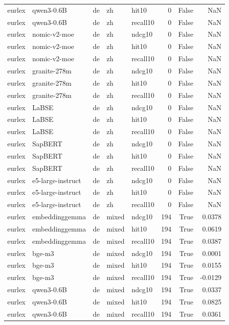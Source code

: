 \begin{tabular}{lllllrrr}
eurlex & qwen3-0.6B & de & zh & hit10 & 0 & False & NaN \\
eurlex & qwen3-0.6B & de & zh & recall10 & 0 & False & NaN \\
eurlex & nomic-v2-moe & de & zh & ndcg10 & 0 & False & NaN \\
eurlex & nomic-v2-moe & de & zh & hit10 & 0 & False & NaN \\
eurlex & nomic-v2-moe & de & zh & recall10 & 0 & False & NaN \\
eurlex & granite-278m & de & zh & ndcg10 & 0 & False & NaN \\
eurlex & granite-278m & de & zh & hit10 & 0 & False & NaN \\
eurlex & granite-278m & de & zh & recall10 & 0 & False & NaN \\
eurlex & LaBSE & de & zh & ndcg10 & 0 & False & NaN \\
eurlex & LaBSE & de & zh & hit10 & 0 & False & NaN \\
eurlex & LaBSE & de & zh & recall10 & 0 & False & NaN \\
eurlex & SapBERT & de & zh & ndcg10 & 0 & False & NaN \\
eurlex & SapBERT & de & zh & hit10 & 0 & False & NaN \\
eurlex & SapBERT & de & zh & recall10 & 0 & False & NaN \\
eurlex & e5-large-instruct & de & zh & ndcg10 & 0 & False & NaN \\
eurlex & e5-large-instruct & de & zh & hit10 & 0 & False & NaN \\
eurlex & e5-large-instruct & de & zh & recall10 & 0 & False & NaN \\
eurlex & embeddinggemma & de & mixed & ndcg10 & 194 & True & 0.0378 \\
eurlex & embeddinggemma & de & mixed & hit10 & 194 & True & 0.0619 \\
eurlex & embeddinggemma & de & mixed & recall10 & 194 & True & 0.0387 \\
eurlex & bge-m3 & de & mixed & ndcg10 & 194 & True & 0.0001 \\
eurlex & bge-m3 & de & mixed & hit10 & 194 & True & 0.0155 \\
eurlex & bge-m3 & de & mixed & recall10 & 194 & True & -0.0129 \\
eurlex & qwen3-0.6B & de & mixed & ndcg10 & 194 & True & 0.0337 \\
eurlex & qwen3-0.6B & de & mixed & hit10 & 194 & True & 0.0825 \\
eurlex & qwen3-0.6B & de & mixed & recall10 & 194 & True & 0.0361 \\

\end{tabular}
